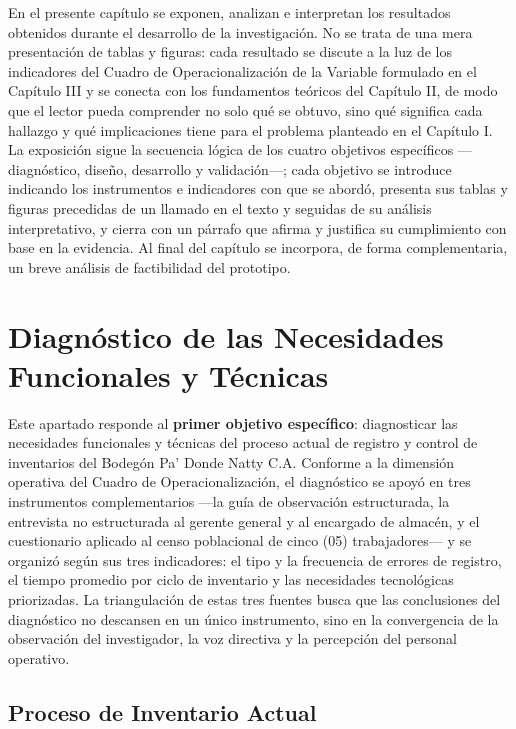 \documentclass[12pt, letterpaper]{report}
\begin{document}
En el presente capítulo se exponen, analizan e interpretan los
resultados obtenidos durante el desarrollo de la investigación. No se
trata de una mera presentación de tablas y figuras: cada resultado se
discute a la luz de los indicadores del Cuadro de Operacionalización
de la Variable formulado en el Capítulo III y se conecta con los
fundamentos teóricos del Capítulo II, de modo que el lector pueda
comprender no solo qué se obtuvo, sino qué significa cada hallazgo y
qué implicaciones tiene para el problema planteado en el Capítulo I.
La exposición sigue la secuencia lógica de los cuatro objetivos
específicos ---diagnóstico, diseño, desarrollo y validación---; cada
objetivo se introduce indicando los instrumentos e indicadores con que
se abordó, presenta sus tablas y figuras precedidas de un llamado en el
texto y seguidas de su análisis interpretativo, y cierra con un párrafo
que afirma y justifica su cumplimiento con base en la evidencia. Al
final del capítulo se incorpora, de forma complementaria, un breve
análisis de factibilidad del prototipo.

\section{Diagnóstico de las Necesidades Funcionales y Técnicas}

Este apartado responde al \textbf{primer objetivo específico}:
diagnosticar las necesidades funcionales y técnicas del proceso actual
de registro y control de inventarios del Bodegón Pa' Donde Natty C.A.
Conforme a la dimensión operativa del Cuadro de Operacionalización, el
diagnóstico se apoyó en tres instrumentos complementarios ---la guía
de observación estructurada, la entrevista no estructurada al gerente
general y al encargado de almacén, y el cuestionario aplicado al censo
poblacional de cinco (05) trabajadores--- y se organizó según sus tres
indicadores: el tipo y la frecuencia de errores de registro, el tiempo
promedio por ciclo de inventario y las necesidades tecnológicas
priorizadas. La triangulación de estas tres fuentes busca que las
conclusiones del diagnóstico no descansen en un único instrumento, sino
en la convergencia de la observación del investigador, la voz directiva
y la percepción del personal operativo.

\subsection{Proceso de Inventario Actual}
\end{document}
